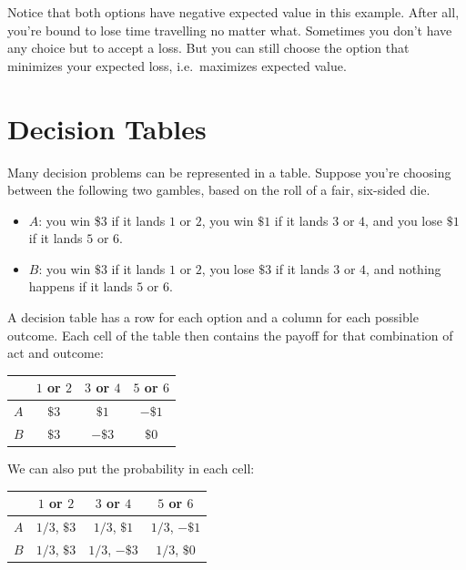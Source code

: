 \documentclass[justified]{tufte-book}
\providecommand{\tightlist}{%
  \setlength{\itemsep}{0pt}\setlength{\parskip}{0pt}}
\theoremstyle{definition}
\theoremstyle{definition}
\theoremstyle{definition}
\theoremstyle{definition}
\theoremstyle{remark}
\begin{document}
Notice that both options have negative expected value in this example. After all, you're bound to lose time travelling no matter what. Sometimes you don't have any choice but to accept a loss. But you can still choose the option that minimizes your expected loss, i.e.~maximizes expected value.

\hypertarget{decision-tables}{%
\section{Decision Tables}\label{decision-tables}}

Many decision problems can be represented in a table. Suppose you're choosing between the following two gambles, based on the roll of a fair, six-sided die.

\begin{itemize}
\tightlist
\item
  \(A\): you win \$3 if it lands \(1\) or \(2\), you win \(\$1\) if it lands \(3\) or \(4\), and you lose \(\$1\) if it lands \(5\) or \(6\).
\item
  \(B\): you win \(\$3\) if it lands \(1\) or \(2\), you lose \(\$3\) if it lands \(3\) or \(4\), and nothing happens if it lands \(5\) or \(6\).
\end{itemize}

A decision table has a row for each option and a column for each possible outcome. Each cell of the table then contains the payoff for that combination of act and outcome:

\begin{longtable}[]{@{}lccc@{}}
\toprule
& \(1\) or \(2\) & \(3\) or \(4\) & \(5\) or \(6\) \\
\midrule
\endhead
\(A\) & \(\$3\) & \(\$1\) & \(-\$1\) \\
\(B\) & \(\$3\) & \(-\$3\) & \(\$0\) \\
\bottomrule
\end{longtable}

We can also put the probability in each cell:

\begin{longtable}[]{@{}lccc@{}}
\toprule
& \(1\) or \(2\) & \(3\) or \(4\) & \(5\) or \(6\) \\
\midrule
\endhead
\(A\) & \(1/3\), \(\$3\) & \(1/3\), \(\$1\) & \(1/3\), \(-\$1\) \\
\(B\) & \(1/3\), \(\$3\) & \(1/3\), \(-\$3\) & \(1/3\), \(\$0\) \\
\bottomrule
\end{longtable}
\end{document}
